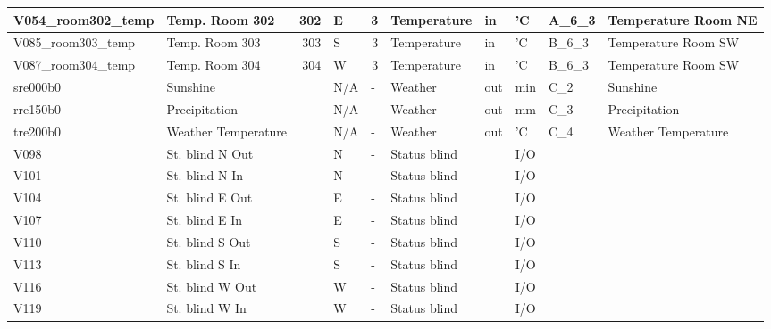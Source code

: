 \begin{landscape}
\begin{table}[htbp]
\begin{tabular}{|l|l|r|l|l|l|r|l|r|r|}
    \hline
    \rowcolor[rgb]{ .851,  .851,  .851} V054\_room302\_temp & Temp. Room 302 & 302  & E    & \multicolumn{1}{r|}{3} & Temperature & \multicolumn{1}{l|}{in} & 'C   & \multicolumn{1}{l|}{A\_6\_3} & \multicolumn{1}{l|}{Temperature Room NE} \bigstrut\\
    \hline
    V085\_room303\_temp & Temp. Room 303 & 303  & S    & \multicolumn{1}{r|}{3} & Temperature & \multicolumn{1}{l|}{in} & 'C   & \multicolumn{1}{l|}{B\_6\_3} & \multicolumn{1}{l|}{Temperature Room SW} \bigstrut\\
    \hline
    \rowcolor[rgb]{ .851,  .851,  .851} V087\_room304\_temp & Temp. Room 304 & 304  & W    & \multicolumn{1}{r|}{3} & Temperature & \multicolumn{1}{l|}{in} & 'C   & \multicolumn{1}{l|}{B\_6\_3} & \multicolumn{1}{l|}{Temperature Room SW} \bigstrut\\
    \hline
    sre000b0 & Sunshine &      & N/A  & -    & Weather  & \multicolumn{1}{l|}{out} & min  & \multicolumn{1}{l|}{C\_2} & \multicolumn{1}{l|}{Sunshine} \bigstrut\\
    \hline
    \rowcolor[rgb]{ .851,  .851,  .851} rre150b0 & Precipitation &      & N/A  & -    & Weather  & \multicolumn{1}{l|}{out} & mm   & \multicolumn{1}{l|}{C\_3} & \multicolumn{1}{l|}{Precipitation} \bigstrut\\
    \hline
    tre200b0 & Weather Temperature &      & N/A  & -    & Weather  & \multicolumn{1}{l|}{out} & 'C   & \multicolumn{1}{l|}{C\_4} & \multicolumn{1}{l|}{Weather Temperature} \bigstrut\\
    \hline
    \rowcolor[rgb]{ .851,  .851,  .851} V098 & St. blind N Out &      & N    & -    & Status blind &      & I/O  &      &  \bigstrut\\
    \hline
    V101 & St. blind N In &      & N    & -    & Status blind &      & I/O  &      &  \bigstrut\\
    \hline
    \rowcolor[rgb]{ .851,  .851,  .851} V104 & St. blind E Out &      & E    & -    & Status blind &      & I/O  &      &  \bigstrut\\
    \hline
    V107 & St. blind E In &      & E    & -    & Status blind &      & I/O  &      &  \bigstrut\\
    \hline
    \rowcolor[rgb]{ .851,  .851,  .851} V110 & St. blind S Out &      & S    & -    & Status blind &      & I/O  &      &  \bigstrut\\
    \hline
    V113 & St. blind S In &      & S    & -    & Status blind &      & I/O  &      &  \bigstrut\\
    \hline
    \rowcolor[rgb]{ .851,  .851,  .851} V116 & St. blind W Out &      & W    & -    & Status blind &      & I/O  &      &  \bigstrut\\
    \hline
    V119 & St. blind W In &      & W    & -    & Status blind &      & I/O  &      &  \bigstrut\\
    \hline
    \end{tabular}%
  \label{tab:metadata_3}%
\end{table}%

\end{landscape}
\restoregeometry


